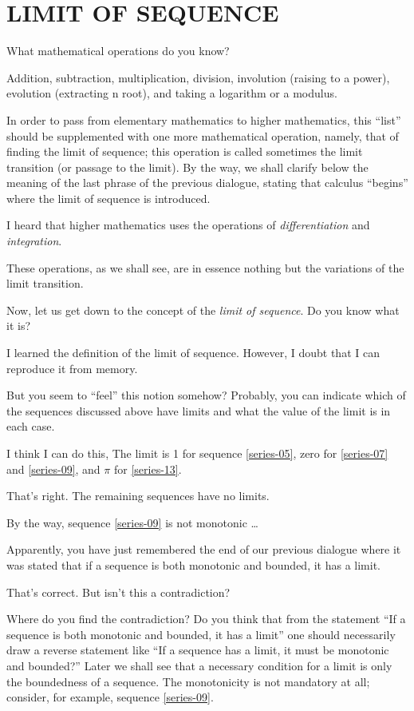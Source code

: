 
\chapter{LIMIT OF SEQUENCE}
\label{dialogue-02}
{\parindent=0pt
\athr What mathematical operations do you know?

\rdr Addition, subtraction, multiplication, division, involution (raising to a power), evolution (extracting n root), and taking a logarithm or a modulus.

\athr In order to pass from elementary mathematics to higher mathematics, this ``list'' should be supplemented with one more mathematical operation, namely, that of finding the limit of sequence; this operation is called sometimes the limit transition (or passage to the limit). By the way, we shall clarify below the meaning of the last phrase of the previous dialogue, stating that calculus ``begins'' where the limit of sequence is introduced. 

\rdr I heard that higher mathematics uses the operations of \emph{differentiation} and \emph{integration}. 

\athr These operations, as we shall see, are in essence nothing but the variations of the limit transition. 

Now, let us get down to the concept of the \emph{limit of sequence}. Do you know what it is? 

\rdr I learned the definition of the limit of sequence. However, I doubt that I can reproduce it from memory. 

\athr But you seem to ``feel'' this notion somehow? Probably, you can indicate which of the sequences discussed above have limits and what the value of the limit is in each case. 

\rdr I think I can do this, The limit is 1 for sequence \eqref{series-05}, zero for \eqref{series-07} and \eqref{series-09}, and $\pi$ for \eqref{series-13}. 

\athr That's right. The remaining sequences have no limits.

\rdr By the way, sequence \eqref{series-09} is not monotonic \ldots

\athr Apparently, you have just remembered the end of our previous dialogue where it was stated that if a sequence is both monotonic and bounded, it has a limit.

\rdr That's correct. But isn't this a contradiction?

\athr Where do you find the contradiction? Do you think that from the statement ``If a sequence is both monotonic and bounded, it has a limit'' one should necessarily draw a reverse statement like ``If a sequence has a limit, it must be monotonic and bounded?'' Later we shall see that a necessary condition for a limit is only the boundedness of a sequence. The monotonicity is not mandatory at all; consider, for example, sequence \eqref{series-09}.

}
